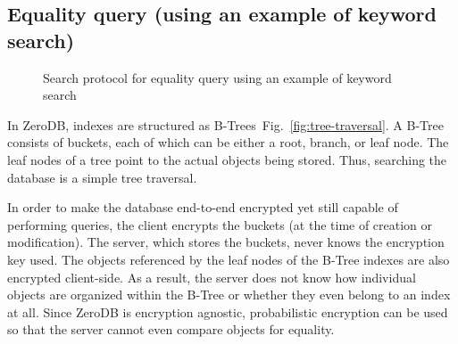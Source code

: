 \documentclass[notitlepage,longbibliography]{revtex4-1}
\newcommand{\figref}[1]{Fig.~\ref{#1}}
\begin{document}
\subsection{Equality query (using an example of keyword search)}
\begin{figure}
	\begin{center}
        \qquad
	\end{center}
    \caption{Search protocol for equality query using an example of keyword search}
	\label{fig:btree-protocol}
\end{figure}

In ZeroDB, indexes are structured as B-Trees~\figref{fig:tree-traversal}.
A B-Tree consists of buckets, each of which can be either a root, branch, or leaf node.
The leaf nodes of a tree point to the actual objects being stored.
Thus, searching the database is a simple tree traversal.

In order to make the database end-to-end encrypted yet still capable of performing queries, the client encrypts the buckets (at the time of creation or modification).
The server, which stores the buckets, never knows the encryption key used.
The objects referenced by the leaf nodes of the B-Tree indexes are also encrypted client-side.
As a result, the server does not know how individual objects are organized within the B-Tree or whether they even belong to an index at all.
Since ZeroDB is encryption agnostic, probabilistic encryption can be used so that the server cannot even compare objects for equality.
\end{document}
